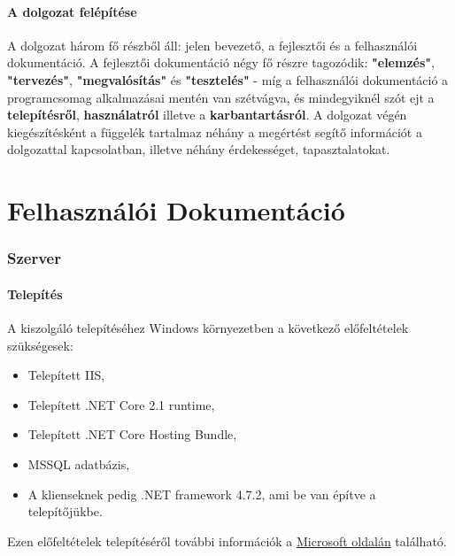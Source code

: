 \documentclass[twoside, a4paper, 12pt]{article}
\begin{document}
\subsection{A dolgozat felépítése}
A dolgozat három fő részből áll: jelen bevezető, a fejlesztői és a felhasználói dokumentáció.
A fejlesztői dokumentáció négy fő részre tagozódik: \textbf{"elemzés"}, \textbf{"tervezés"}, \textbf{"megvalósítás"} és \textbf{"tesztelés"} - míg a felhasználói dokumentáció a programcsomag alkalmazásai mentén van szétvágva, és mindegyiknél szót ejt a \textbf{telepítésről}, \textbf{használatról} illetve a \textbf{karbantartásról}.
A dolgozat végén kiegészítésként a függelék tartalmaz néhány a megértést segítő információt a dolgozattal kapcsolatban, illetve néhány érdekességet, tapasztalatokat.










































\newpage
\part{Felhasználói Dokumentáció}

\section{Szerver}
\subsection{Telepítés}
A kiszolgáló telepítéséhez Windows környezetben a következő előfeltételek szükségesek:
\begin{itemize}
	\item Telepített IIS,
	\item Telepített .NET Core 2.1 runtime,
	\item Telepített .NET Core Hosting Bundle,
	\item MSSQL adatbázis,
	\item A klienseknek pedig .NET framework 4.7.2, ami be van építve a telepítőjükbe.
\end{itemize}
Ezen előfeltételek telepítéséről további információk a \href{https://docs.microsoft.com/en-us/aspnet/core/host-and-deploy/iis/?view=aspnetcore-2.2}{Microsoft oldalán} található.
\end{document}
